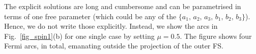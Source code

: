 \documentclass[aps,prb,onecolumn, footinbib, 10pt]{revtex4-2}
\def \nn{\nonumber \\}
\begin{document}
The explicit solutions are long and cumbersome and can be parametrised in terms of one free parameter (which could be any of the $\lbrace a_1, \, a_2, \, a_3, \,b_1, \, b_2, \,b_3 \rbrace $). Hence, we do not write those explicitly. Instead, we show the arcs in Fig.~\ref{fig_spin1}(b) for one single case by setting $\mu=0.5$. The figure shows four Fermi arcs, in total, emanating outside the projection of the outer FS.


%
\end{document}
